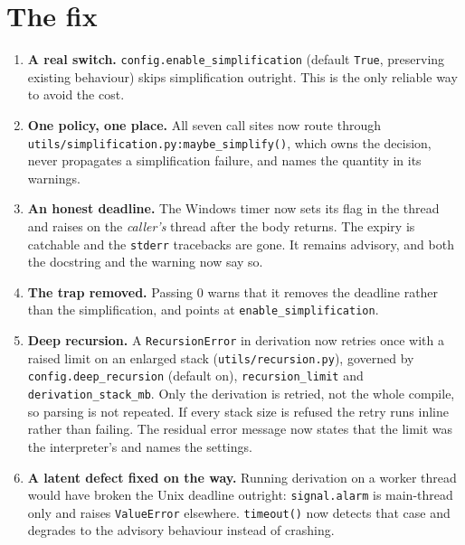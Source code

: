 \documentclass[11pt,a4paper]{article}
\newcommand{\code}[1]{\texttt{\small #1}}
\begin{document}
\section{The fix}

\begin{enumerate}[leftmargin=1.5em,itemsep=0.35em]
  \item \textbf{A real switch.} \code{config.enable\_simplification} (default
        \code{True}, preserving existing behaviour) skips simplification
        outright. This is the only reliable way to avoid the cost.
  \item \textbf{One policy, one place.} All seven call sites now route through
        \code{utils/simplification.py:maybe\_simplify()}, which owns the
        decision, never propagates a simplification failure, and names the
        quantity in its warnings.
  \item \textbf{An honest deadline.} The Windows timer now sets its flag in the
        thread and raises on the \emph{caller's} thread after the body returns.
        The expiry is catchable and the \code{stderr} tracebacks are gone. It
        remains advisory, and both the docstring and the warning now say so.
  \item \textbf{The trap removed.} Passing $0$ warns that it removes the
        deadline rather than the simplification, and points at
        \code{enable\_simplification}.
  \item \textbf{Deep recursion.} A \code{RecursionError} in derivation now
        retries once with a raised limit on an enlarged stack
        (\code{utils/recursion.py}), governed by \code{config.deep\_recursion}
        (default on), \code{recursion\_limit} and \code{derivation\_stack\_mb}.
        Only the derivation is retried, not the whole compile, so parsing is
        not repeated. If every stack size is refused the retry runs inline
        rather than failing. The residual error message now states that the
        limit was the interpreter's and names the settings.
  \item \textbf{A latent defect fixed on the way.} Running derivation on a
        worker thread would have broken the Unix deadline outright:
        \code{signal.alarm} is main-thread only and raises \code{ValueError}
        elsewhere. \code{timeout()} now detects that case and degrades to the
        advisory behaviour instead of crashing.
\end{enumerate}
\end{document}
